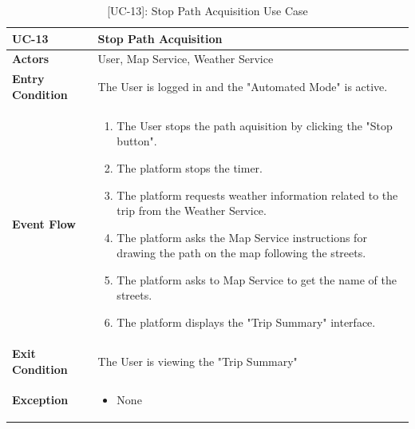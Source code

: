 \begin{table}[H]
    \centering
    \setlength\extrarowheight{2pt}
    \renewcommand{\arraystretch}{1.2}
    \begin{tabularx}{\textwidth}{|>{\bfseries}l|X|}
    \hline
    UC-13& Stop Path Acquisition \\ \hline
    Actors & User, Map Service, Weather Service\\ \hline
    Entry Condition & The User is logged in and the "Automated Mode" is active.\\ \hline
    Event Flow & 
    \begin{enumerate}
      \item The User stops the path aquisition by clicking the "Stop button".
      \item The platform stops the timer.
      \item The platform requests weather information related to the trip from the Weather Service.
      \item The platform asks the Map Service instructions for drawing the path on the map following the streets.
      \item The platform asks to Map Service to get the name of the streets.
      \item The platform displays the "Trip Summary" interface.
    \end{enumerate}
    \\ \hline
    Exit Condition & The User is viewing the "Trip Summary"\\ \hline
    Exception & 
    \begin{itemize}
        \item None
    \end{itemize}
    \\ \hline
   \end{tabularx}
   \caption{[UC-13]: Stop Path Acquisition Use Case}
    \label{UC-13}
\end{table}

